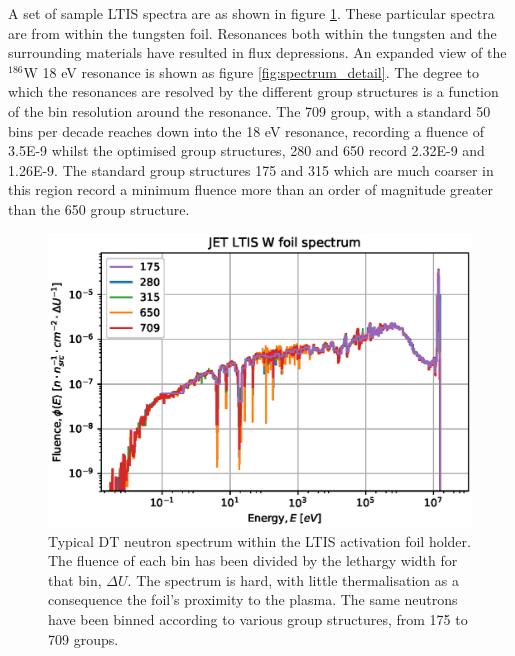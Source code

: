A set of sample LTIS spectra are as shown in figure \ref{fig:spectrum}. These particular spectra are from within the tungsten foil. Resonances both within the tungsten and the surrounding materials have resulted in flux depressions. An expanded view of the $^{186}$W 18 eV resonance is shown as figure \ref{fig:spectrum_detail}. The degree to which the resonances are resolved by the different group structures is a function of the bin resolution around the resonance. The 709 group, with a standard 50 bins per decade reaches down into the 18 eV resonance, recording a fluence of 3.5E-9 whilst the optimised group structures, 280 and 650 record 2.32E-9 and 1.26E-9. The standard group structures 175 and 315 which are much coarser in this region record a minimum fluence more than an order of magnitude greater than the 650 group structure.

\begin{figure}[H]
  \centering
  \includegraphics[width=\linewidth]{W186_spectra_diff_groups.eps}
  \caption{Typical DT neutron spectrum within the LTIS activation foil holder. The fluence of each bin has been divided by the lethargy width for that bin, $\Delta U$. The spectrum is hard, with little thermalisation as a consequence the foil's proximity to the plasma. The same neutrons have been binned according to various group structures, from 175 to 709 groups.}
  \label{fig:spectrum}
\end{figure}

